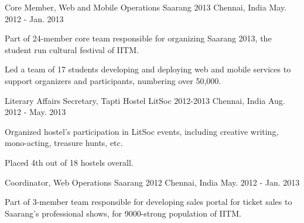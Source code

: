 \begin{cventries}
	\cventry
	{Core Member, Web and Mobile Operations}
	{Saarang 2013}
	{Chennai, India}
	{May. 2012 - Jan. 2013}
	{
		\begin{cvitems}
		\item{Part of 24-member core team responsible for organizing Saarang 2013, the student run cultural festival of IITM.}
		\item{Led a team of 17 students developing and deploying web and mobile services to support organizers and participants, numbering over 50,000.}
		\end{cvitems}
	}

	\cventry
	{Literary Affairs Secretary, Tapti Hostel}
	{LitSoc 2012-2013}
	{Chennai, India}
	{Aug. 2012 - May. 2013}
	{
		\begin{cvitems}
		\item{Organized hostel's participation in LitSoc events, including creative writing, mono-acting, treasure hunts, etc.}
		\item{Placed 4th out of 18 hostels overall.}
		\end{cvitems}
	}

	\cventry
	{Coordinator, Web Operations}
	{Saarang 2012}
	{Chennai, India}
	{May. 2012 - Jan. 2013}
	{
		\begin{cvitems}
		\item{Part of 3-member team responsible for developing sales portal for ticket sales to Saarang's professional shows, for 9000-strong population of IITM.}
		\end{cvitems}
	}

\end{cventries}
